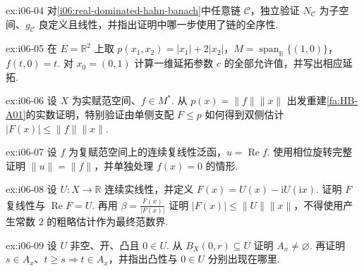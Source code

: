 \begin{FAExercise}[Zorn链的并]{ex:i06-04}
对\autoref{i06:real-dominated-hahn-banach}中任意链 \(\displaystyle \mathcal C\)，独立验证 \(\displaystyle N_{\mathcal C}\) 为子空间、\(\displaystyle g_{\mathcal C}\) 良定义且线性，并指出证明中哪一步使用了链的全序性.
\end{FAExercise}

\begin{FAExercise}[实支配型延拓的具体计算]{ex:i06-05}
在 \(\displaystyle E=\mathbb R^2\) 上取 \(\displaystyle p(x_1,x_2)=|x_1|+2|x_2|\)，\(\displaystyle M=\operatorname{span}_{\mathbb R}\{(1,0)\}\)，\(\displaystyle f(t,0)=t\). 对 \(\displaystyle x_0=(0,1)\) 计算一维延拓参数 \(\displaystyle c\) 的全部允许值，并写出相应延拓.
\end{FAExercise}

\begin{FAExercise}{ex:i06-06}
设 \(\displaystyle X\) 为实赋范空间、\(\displaystyle f\in M^*\). 从 \(\displaystyle p(x)=\|f\|\|x\|\) 出发重建\autoref{fa:HB-A01}的实数证明，特别验证由单侧支配 \(\displaystyle F\leqslant p\) 如何得到双侧估计 \(\displaystyle |F(x)|\leqslant\|f\|\|x\|\).
\end{FAExercise}

\begin{FAExercise}[复泛函的实部范数]{ex:i06-07}
设 \(\displaystyle f\) 为复赋范空间上的连续复线性泛函，\(\displaystyle u=\operatorname{Re}f\). 使用相位旋转完整证明 \(\displaystyle \|u\|=\|f\|\)，并单独处理 \(\displaystyle f(x)=0\) 的情形.
\end{FAExercise}

\begin{FAExercise}[复线性重建与无常数损失]{ex:i06-08}
设 \(\displaystyle U:X\to\mathbb R\) 连续实线性，并定义 \(\displaystyle F(x)=U(x)-\mathrm{i}U(\mathrm{i}x)\). 证明 \(\displaystyle F\) 复线性与 \(\displaystyle \operatorname{Re}F=U\). 再用 \(\displaystyle \beta=\frac{\overline{F(x)}}{|F(x)|}\) 证明 \(\displaystyle |F(x)|\leqslant\|U\|\|x\|\)，不得使用产生常数 \(\displaystyle2\) 的粗略估计作为最终范数界.
\end{FAExercise}

\begin{FAExercise}[Minkowski吸收性与尺度上闭]{ex:i06-09}
设 \(\displaystyle U\) 非空、开、凸且 \(\displaystyle0\in U\). 从 \(\displaystyle B_X(0,r)\subseteq U\) 证明 \(\displaystyle A_x\neq\varnothing\). 再证明 \(\displaystyle s\in A_x\)、\(\displaystyle t\geqslant s\Rightarrow t\in A_x\)，并指出凸性与 \(\displaystyle0\in U\) 分别出现在哪里.
\end{FAExercise}

